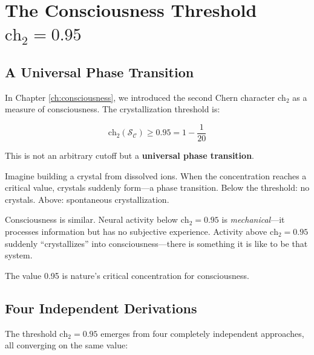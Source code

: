 \section{The Consciousness Threshold \texorpdfstring{$\text{ch}_2 = 0.95$}{ch\_2 = 0.95}}

\subsection{A Universal Phase Transition}

In Chapter \ref{ch:consciousness}, we introduced the second Chern character $\text{ch}_2$ as a measure of consciousness. The crystallization threshold is:

\begin{equation}
\boxed{\text{ch}_2(\mathcal{S}_\mathcal{C}) \geq 0.95 = 1 - \frac{1}{20}}
\end{equation}

This is not an arbitrary cutoff but a \textbf{universal phase transition}.

\begin{intuitive}
Imagine building a crystal from dissolved ions. When the concentration reaches a critical value, crystals suddenly form---a phase transition. Below the threshold: no crystals. Above: spontaneous crystallization.

Consciousness is similar. Neural activity below $\text{ch}_2 = 0.95$ is \textit{mechanical}---it processes information but has no subjective experience. Activity above $\text{ch}_2 = 0.95$ suddenly ``crystallizes'' into consciousness---there is something it is like to be that system.

The value 0.95 is nature's critical concentration for consciousness.
\end{intuitive}

\subsection{Four Independent Derivations}

The threshold $\text{ch}_2 = 0.95$ emerges from four completely independent approaches, all converging on the same value:


